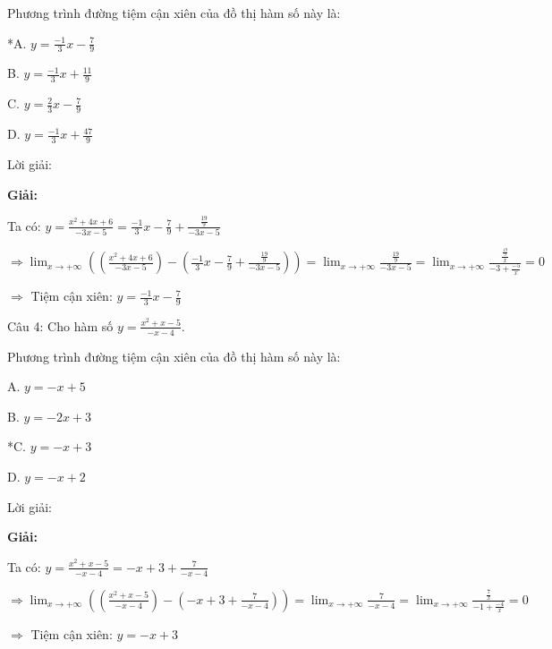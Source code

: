 \documentclass[a4paper,12pt]{article}
\begin{document}
Phương trình đường tiệm cận xiên của đồ thị hàm số này là:

*A. \(y = \frac{-1}{3}x - \frac{7}{9}\)

B. \(y = \frac{-1}{3}x + \frac{11}{9}\)

C. \(y = \frac{2}{3}x - \frac{7}{9}\)

D. \(y = \frac{-1}{3}x + \frac{47}{9}\)

Lời giải:

\textbf{Giải:}

Ta có: \(y = \frac{x^{2} + 4x + 6}{-3x - 5} = \frac{-1}{3}x - \frac{7}{9} + \frac{\frac{19}{9}}{-3x - 5}\)

\(\Rightarrow \displaystyle\lim_{x \to +\infty} \left(\left(\frac{x^{2} + 4x + 6}{-3x - 5}\right) - \left(\frac{-1}{3}x - \frac{7}{9} + \frac{\frac{19}{9}}{-3x - 5}\right)\right) = \displaystyle\lim_{x \to +\infty} \frac{\frac{19}{9}}{-3x - 5} = \displaystyle\lim_{x \to +\infty} \frac{\frac{\frac{19}{9}}{x}}{-3 + \frac{-5}{x}} = 0\)

\(\Rightarrow\) Tiệm cận xiên: \(y = \frac{-1}{3}x - \frac{7}{9}\)


Câu 4: Cho hàm số \(y = \frac{x^{2} + x - 5}{-x - 4}\).

Phương trình đường tiệm cận xiên của đồ thị hàm số này là:

A. \(y = -x + 5\)

B. \(y = -2x + 3\)

*C. \(y = -x + 3\)

D. \(y = -x + 2\)

Lời giải:

\textbf{Giải:}

Ta có: \(y = \frac{x^{2} + x - 5}{-x - 4} = -x + 3 + \frac{7}{-x - 4}\)

\(\Rightarrow \displaystyle\lim_{x \to +\infty} \left(\left(\frac{x^{2} + x - 5}{-x - 4}\right) - \left(-x + 3 + \frac{7}{-x - 4}\right)\right) = \displaystyle\lim_{x \to +\infty} \frac{7}{-x - 4} = \displaystyle\lim_{x \to +\infty} \frac{\frac{7}{x}}{-1 + \frac{-4}{x}} = 0\)

\(\Rightarrow\) Tiệm cận xiên: \(y = -x + 3\)
\end{document}
